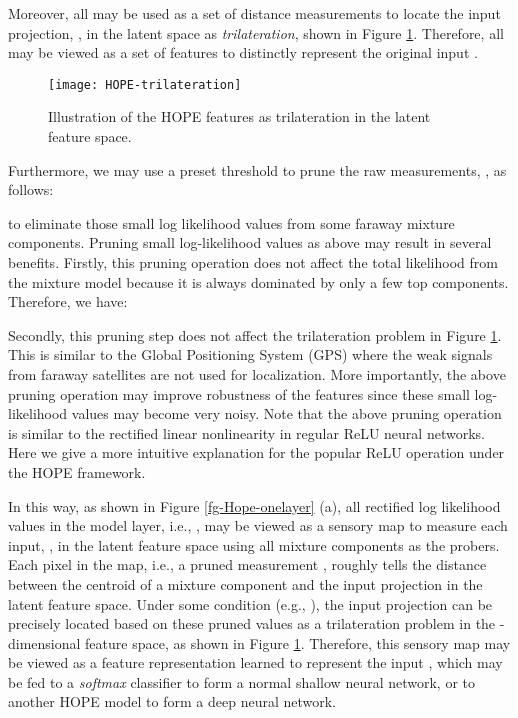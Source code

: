 \documentclass[11pt]{article}
\begin{document}
Moreover, all  may be used as a set of distance measurements to locate the input projection, , in the latent space as {\em trilateration}, shown in Figure \ref{fg-Hope-trilateration}. Therefore, all  may be viewed as a set of features to distinctly represent the original input .

\begin{figure}[h]   
	\begin{center}    
    \texttt{[image: HOPE-trilateration]}   
    \caption{Illustration of the HOPE features as trilateration in the latent feature space. \label{fg-Hope-trilateration}}
	\end{center}
\end{figure}

Furthermore, we may use a preset threshold   to prune the raw measurements, , as follows:

to eliminate those small log likelihood values from some faraway mixture components.
Pruning small log-likelihood values as above may result in several benefits. 
Firstly, this pruning operation 
does not affect the total likelihood from the mixture model because it is always dominated by only a few top components. Therefore,  we have:

Secondly, this pruning step does not affect the trilateration problem in Figure \ref{fg-Hope-trilateration}. This is similar to the Global Positioning System (GPS) where the weak signals from faraway satellites are not used for localization. 
More importantly,  the above pruning operation may improve robustness of the features since these small log-likelihood values may become very noisy. 
Note that the above pruning operation is similar to the rectified linear nonlinearity in regular ReLU neural networks. Here we give a more intuitive explanation for the popular ReLU operation under the HOPE framework. 

In this way, as shown in Figure \ref{fg-Hope-onelayer} (a), all rectified log likelihood values in the model layer, i.e., , may be viewed as a sensory map to measure each input, , in the latent feature space using all mixture components as the probers. Each pixel in the map, i.e., a pruned measurement , roughly tells the distance between the centroid of a mixture component and the input projection  in the latent feature space. Under some condition (e.g., ), the input projection can be precisely located based on these pruned  values as a trilateration problem in the -dimensional feature space, as shown in Figure \ref{fg-Hope-trilateration}. Therefore, this sensory map may be viewed as a feature representation learned to represent the input , which may be fed to a {\em softmax} classifier to form a normal shallow neural network, or to another HOPE model to form a deep neural network. 
\end{document}
